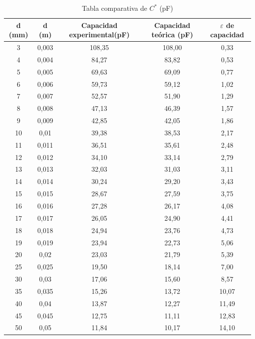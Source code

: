 \documentclass{article}
\begin{document}
   \begin{table}[H]
   \centering
   \begin{adjustbox}{max width=\columnwidth}
   \begin{tabular}{|c|c|c|c|c|}
    	\hline
        d (mm) & d (m) & Capacidad experimental(pF) & Capacidad teórica (pF) & $\varepsilon$ de capacidad \\ \hline
3	&0,003	&108,35	& 108,00    	&0,33\\
4	&0,004	&84,27	& 83,82    	&0,53\\
5	&0,005	&69,63	& 69,09    	&0,77\\
6	&0,006	&59,73	& 59,12    	&1,02\\
7	&0,007	&52,57	& 51,90    	&1,29\\
8	&0,008	&47,13	& 46,39    	&1,57\\
9	&0,009	&42,85	& 42,05    	&1,86\\
10	&0,01	&39,38	& 38,53    	&2,17\\
11	&0,011	&36,51	& 35,61    	&2,48\\
12	&0,012	&34,10	& 33,14    	&2,79\\
13	&0,013	&32,03	& 31,03    	&3,11\\
14	&0,014	&30,24	& 29,20    	&3,43\\
15	&0,015	&28,67	& 27,59    	&3,75\\
16	&0,016	&27,28	& 26,17    	&4,08\\
17	&0,017	&26,05	& 24,90    	&4,41\\
18	&0,018	&24,94	& 23,76    	&4,73\\
19	&0,019	&23,94	& 22,73    	&5,06\\
20	&0,02	&23,03	& 21,79    	&5,39\\
25	&0,025	&19,50	& 18,14    	&7,00\\
30	&0,03	&17,06	& 15,60    	&8,57\\
35	&0,035	&15,26	& 13,72    	&10,07\\
40	&0,04	&13,87	& 12,27    	&11,49\\
45	&0,045	&12,75	& 11,11    	&12,83\\
50	&0,05	&11,84	& 10,17    	&14,10\\
    \hline
	\end{tabular}
	\end{adjustbox}
	\caption{Tabla comparativa de $C^{*}$ (pF)}
    \end{table}
\end{document}
